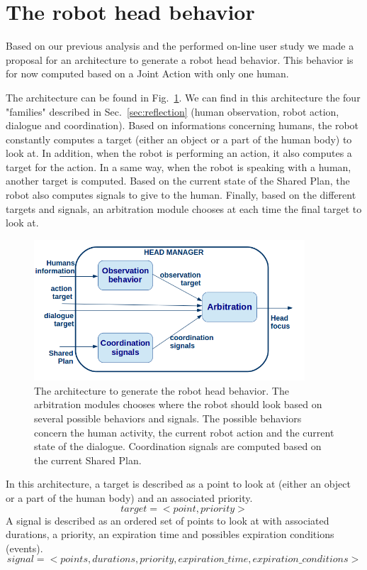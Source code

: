 \documentclass[english,a4paper,11pt,twoside]{StyleThese}
\begin{document}
\section{The robot head behavior}

Based on our previous analysis and the performed on-line user study we made a proposal for an architecture to generate a robot head behavior. This behavior is for now computed based on a Joint Action with only one human.

The architecture can be found in Fig.~\ref{fig:headArchi}. We can find in this architecture the four "families" described in Sec.~\ref{sec:reflection} (human observation, robot action, dialogue and coordination). Based on informations concerning humans, the robot constantly computes a target (either an object or a part of the human body) to look at. In addition, when the robot is performing an action, it also computes a target for the action. In a same way, when the robot is speaking with a human, another target is computed. Based on the current state of the Shared Plan, the robot also computes signals to give to the human. Finally, based on the different targets and signals, an arbitration module chooses at each time the final target to look at.

\begin{figure}[!h]
	\centering
    \includegraphics[width=0.9\textwidth]{figs/Chapter6/Head_archi.png}
    \caption{The architecture to generate the robot head behavior. The arbitration modules chooses where the robot should look based on several possible behaviors and signals. The possible behaviors concern the human activity, the current robot action and the current state of the dialogue. Coordination signals are computed based on the current Shared Plan.}
    \label{fig:headArchi}
\end{figure}

In this architecture, a target is described as a point to look at (either an object or a part of the human body) and an associated priority.
$$target = <point, priority>$$
\newpage
A signal is described as an ordered set of points to look at with associated durations, a priority, an expiration time and possibles expiration conditions (events).
$$signal = <points, durations, priority, expiration\_time, expiration\_conditions>$$
\end{document}
